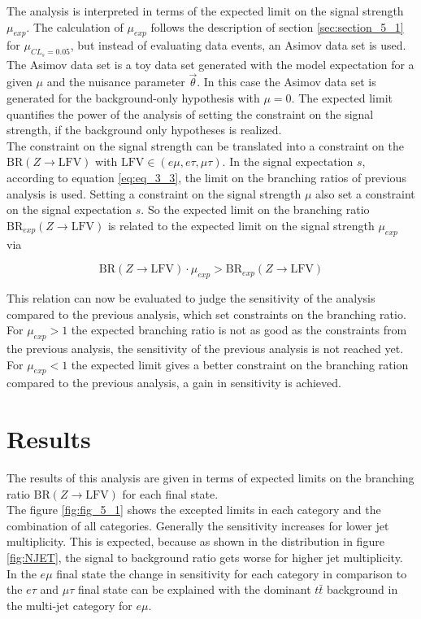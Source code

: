 The analysis is interpreted in terms of the expected limit on the signal strength $\mu_{exp}$. The calculation of $\mu_{exp}$ follows the description of section \ref{sec:section_5_1} for $\mu_{CL_s = 0.05}$, but instead of evaluating data events, an Asimov data set \cite{ASIMOV} is used. The Asimov data set is a toy data set generated with the model expectation for a given $\mu$ and the nuisance parameter $\vec{\theta}$. In this case the Asimov data set is generated for the background-only hypothesis with $\mu = 0$. The expected limit quantifies the power of the analysis of setting the constraint on the signal strength, if the background only hypotheses is realized. \\

The constraint on the signal strength can be translated into a constraint on the $\text{BR}(Z\to\text{LFV})$ with $\text{LFV} \in (e\mu, e\tau, \mu\tau)$. In the signal expectation $s$, according to equation \ref{eq:eq_3_3}, the limit on the branching ratios of previous analysis is used. Setting a constraint on the signal strength $\mu$ also set a constraint on the signal expectation $s$. So the expected limit on the branching ratio $\text{BR}_{exp}(Z\to\text{LFV})$ is related to the expected limit on the signal strength $\mu_{exp}$ via 

\begin{equation}
	\text{BR}(Z\to\text{LFV}) \cdot \mu_{exp} > \text{BR}_{exp}(Z\to\text{LFV})
\end{equation}

This relation can now be evaluated to judge the sensitivity of the analysis compared to the previous analysis, which set constraints on the branching ratio. For $\mu_{exp} > 1$ the expected branching ratio is not as good as the constraints from the previous analysis, the sensitivity of the previous analysis is not reached yet. For $\mu_{exp} < 1$ the expected limit gives a better constraint on the branching ration compared to the previous analysis, a gain in sensitivity is achieved. 


\section{Results}
\label{sec:section_5_3}

The results of this analysis are given in terms of expected limits on the branching ratio $\text{BR}(Z\to\text{LFV})$ for each final state. \\

The figure \ref{fig:fig_5_1} shows the excepted limits in each category and the combination of all categories. Generally the sensitivity increases for lower jet multiplicity. This is expected, because as shown in the distribution in figure \ref{fig:NJET}, the signal to background ratio gets worse for higher jet multiplicity. In the $e\mu$ final state the change in sensitivity for each category in comparison to the $e\tau$ and $\mu\tau$ final state can be explained with the dominant $t\bar{t}$ background in the multi-jet category for $e\mu$. \\

